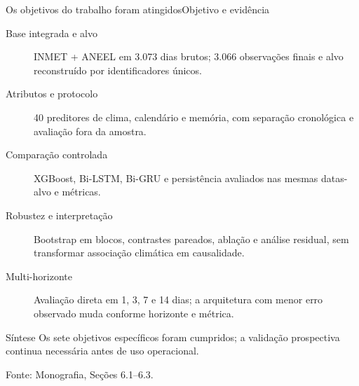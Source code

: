 \documentclass[10pt]{beamer}
\newcommand{\source}[1]{%
  \par\vfill{\raggedleft\tiny\color{gray}Fonte: #1\par}%
}
\begin{document}
\begin{frame}{Os objetivos do trabalho foram atingidos}{Objetivo e evidência}
  \small
  \begin{description}
    \item[Base integrada e alvo] INMET + ANEEL em 3.073 dias brutos; 3.066 observações finais e alvo reconstruído por identificadores únicos.
    \item[Atributos e protocolo] 40 preditores de clima, calendário e memória, com separação cronológica e avaliação fora da amostra.
    \item[Comparação controlada] XGBoost, Bi-LSTM, Bi-GRU e persistência avaliados nas mesmas datas-alvo e métricas.
    \item[Robustez e interpretação] Bootstrap em blocos, contrastes pareados, ablação e análise residual, sem transformar associação climática em causalidade.
    \item[Multi-horizonte] Avaliação direta em 1, 3, 7 e 14 dias; a arquitetura com menor erro observado muda conforme horizonte e métrica.
  \end{description}

  \begin{block}{Síntese}
    Os sete objetivos específicos foram cumpridos; a validação prospectiva continua necessária antes de uso operacional.
  \end{block}

  \source{Monografia, Seções 6.1--6.3.}
\end{frame}
\end{document}

